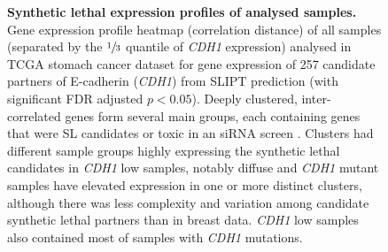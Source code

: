 \begin{figure}[!ht]
  \centering
    \caption[Synthetic lethal expression profiles of stomach samples]{\small \textbf{Synthetic lethal expression profiles of analysed samples.} Gene expression profile heatmap (correlation distance) of all samples (separated by the $\sfrac{1}{3}$ quantile of \textit{CDH1} expression) analysed in \gls{TCGA} stomach cancer dataset for gene expression of 257 candidate partners of \gls{E-cadherin} (\textit{CDH1}) from \gls{SLIPT} prediction (with significant \gls{FDR} adjusted $p < 0.05$). Deeply clustered, inter-correlated genes form several main groups, each containing genes that were SL candidates or toxic in an \gls{siRNA} screen \citep{Telford2015}. Clusters had different sample groups highly expressing the synthetic lethal candidates in \textit{CDH1} low samples, notably diffuse and \textit{CDH1} mutant samples have elevated expression in one or more distinct clusters, although there was less complexity and variation among candidate synthetic lethal partners than in breast data. \textit{CDH1} low samples also contained most of samples with \textit{CDH1} mutations.
}
\label{fig:slipt_expr_stad_mtSL}
\end{figure}

